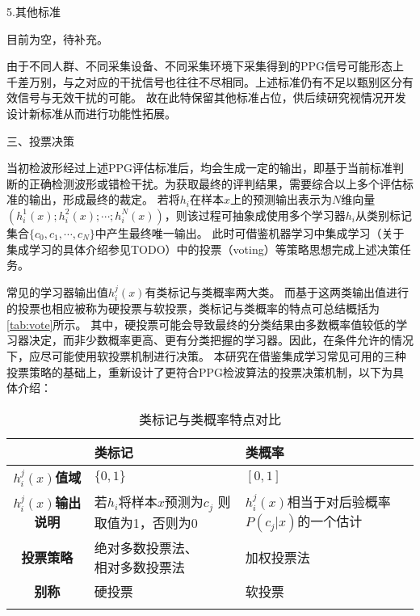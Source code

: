 5.其他标准

目前为空，待补充。

由于不同人群、不同采集设备、不同采集环境下采集得到的PPG信号可能形态上千差万别，与之对应的干扰信号也往往不尽相同。上述标准仍有不足以甄别区分有效信号与无效干扰的可能。
故在此特保留其他标准占位，供后续研究视情况开发设计新标准从而进行功能性拓展。

三、投票决策

当初检波形经过上述PPG评估标准后，均会生成一定的输出，即基于当前标准判断的正确检测波形或错检干扰。为获取最终的评判结果，需要综合以上多个评估标准的输出，形成最终的裁定。
若将$h_i$在样本$x$上的预测输出表示为$N$维向量$(h_i^1(x);h_i^2(x);\cdots;h_i^N(x))$，则该过程可抽象成使用多个学习器$h_i$从类别标记集合$\{c_0,c_1,\cdots,c_N\}$中产生最终唯一输出。
此时可借鉴机器学习中集成学习（关于集成学习的具体介绍参见TODO）中的投票（voting）等策略思想完成上述决策任务\cite{Zhou2016}。

常见的学习器输出值$h_i^j(x)$有类标记与类概率两大类。
而基于这两类输出值进行的投票也相应被称为硬投票与软投票，类标记与类概率的特点可总结概括为\autoref{tab:vote}所示。
其中，硬投票可能会导致最终的分类结果由多数概率值较低的学习器决定，而非少数概率更高、更有分类把握的学习器。因此，在条件允许的情况下，应尽可能使用软投票机制进行决策。
本研究在借鉴集成学习常见可用的三种投票策略的基础上\cite{Kittler1998,Zhou2016}，重新设计了更符合PPG检波算法的投票决策机制，以下为具体介绍：
\begin{table}[htbp]
    \centering
    \caption{\label{tab:vote}类标记与类概率特点对比}
    \begin{tabularx}{\linewidth}{c|X<{\centering}X<{\centering}}
        \Xhline{1pt} 
            &\textbf{类标记}&\textbf{类概率}\\
        \hline
        \textbf{$h_i^j(x)$值域}  &$\{0,1\}$    &$[0,1]$     \\
        \textbf{$h_i^j(x)$输出说明}&\tabincell{c}{若$h_i$将样本$x$预测为$c_j$\\则取值为1，否则为0}&\tabincell{c}{$h_i^j(x)$相当于对后验概率\\$P(c_j|x)$的一个估计}\\
        \textbf{投票策略}&\tabincell{c}{绝对多数投票法、\\相对多数投票法}&加权投票法\\
        \textbf{别称}    &硬投票 &软投票 \\
        \Xhline{1pt}
    \end{tabularx}
\end{table}

